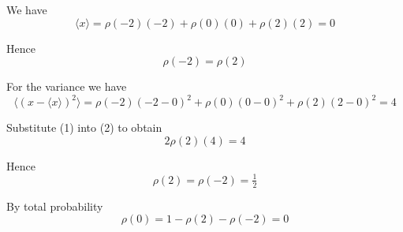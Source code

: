 


\bigskip
We have
\begin{equation*}
\langle x\rangle=\rho(-2)(-2)+\rho(0)(0)+\rho(2)(2)=0
\end{equation*}

Hence
\begin{equation*}
\rho(-2)=\rho(2)\tag{1}
\end{equation*}

For the variance we have
\begin{equation*}
\langle(x-\langle x\rangle)^2\rangle=\rho(-2)(-2-0)^2+\rho(0)(0-0)^2+\rho(2)(2-0)^2=4\tag{2}
\end{equation*}

Substitute (1) into (2) to obtain
\begin{equation*}
2\rho(2)(4)=4
\end{equation*}

Hence
\begin{equation*}
\rho(2)=\rho(-2)=\tfrac{1}{2}
\end{equation*}

By total probability
\begin{equation*}
\rho(0)=1-\rho(2)-\rho(-2)=0
\end{equation*}


